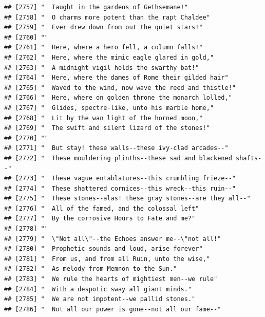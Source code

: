 \documentclass{article}\usepackage[]{graphicx}\usepackage[]{color}
\makeatletter
\newenvironment{kframe}{%
 \def\at@end@of@kframe{}%
 \ifinner\ifhmode%
  \def\at@end@of@kframe{\end{minipage}}%
  \begin{minipage}{\columnwidth}%
 \fi\fi%
 \def\FrameCommand##1{\hskip\@totalleftmargin \hskip-\fboxsep
 \colorbox{shadecolor}{##1}\hskip-\fboxsep
     \hskip-\linewidth \hskip-\@totalleftmargin \hskip\columnwidth}%
 \MakeFramed {\advance\hsize-\width
   \@totalleftmargin\z@ \linewidth\hsize
   \@setminipage}}%
 {\par\unskip\endMakeFramed%
 \at@end@of@kframe}
\newenvironment{knitrout}{}{} %
\makeatother
\begin{document}
\begin{knitrout}
\begin{kframe}
\begin{verbatim}
## [2757] "  Taught in the gardens of Gethsemane!"                                      
## [2758] "  O charms more potent than the rapt Chaldee"                                
## [2759] "  Ever drew down from out the quiet stars!"                                  
## [2760] ""                                                                            
## [2761] "  Here, where a hero fell, a column falls!"                                  
## [2762] "  Here, where the mimic eagle glared in gold,"                               
## [2763] "  A midnight vigil holds the swarthy bat!"                                   
## [2764] "  Here, where the dames of Rome their gilded hair"                           
## [2765] "  Waved to the wind, now wave the reed and thistle!"                         
## [2766] "  Here, where on golden throne the monarch lolled,"                          
## [2767] "  Glides, spectre-like, unto his marble home,"                               
## [2768] "  Lit by the wan light of the horned moon,"                                  
## [2769] "  The swift and silent lizard of the stones!"                                
## [2770] ""                                                                            
## [2771] "  But stay! these walls--these ivy-clad arcades--"                           
## [2772] "  These mouldering plinths--these sad and blackened shafts--"                
## [2773] "  These vague entablatures--this crumbling frieze--"                         
## [2774] "  These shattered cornices--this wreck--this ruin--"                         
## [2775] "  These stones--alas! these gray stones--are they all--"                     
## [2776] "  All of the famed, and the colossal left"                                   
## [2777] "  By the corrosive Hours to Fate and me?"                                    
## [2778] ""                                                                            
## [2779] "  \"Not all\"--the Echoes answer me--\"not all!"                             
## [2780] "  Prophetic sounds and loud, arise forever"                                  
## [2781] "  From us, and from all Ruin, unto the wise,"                                
## [2782] "  As melody from Memnon to the Sun."                                         
## [2783] "  We rule the hearts of mightiest men--we rule"                              
## [2784] "  With a despotic sway all giant minds."                                     
## [2785] "  We are not impotent--we pallid stones."                                    
## [2786] "  Not all our power is gone--not all our fame--"                             

\end{verbatim}
\end{kframe}
\end{knitrout}
\end{document}
